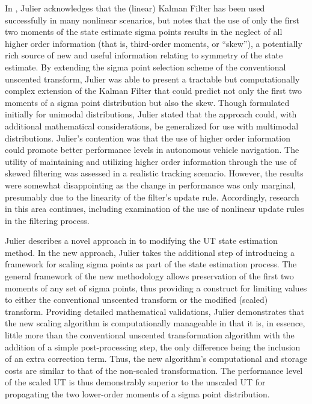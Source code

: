 In \cite{Julier1998}, Julier acknowledges that the (linear) Kalman Filter has been used successfully in many nonlinear scenarios, but notes that the use of only the first two moments of the state estimate sigma points results in the neglect of all higher order information (that is, third-order moments, or ``skew''), a potentially rich source of new and useful information relating to symmetry of the state estimate. By extending the sigma point selection scheme of the conventional unscented transform, Julier was able to present a tractable but computationally complex extension of the Kalman Filter that could predict not only the first two moments of a sigma point distribution but also the skew. Though formulated initially for unimodal distributions, Julier stated that the approach could, with additional mathematical considerations, be generalized for use with multimodal distributions. Julier's contention was that the use of higher order information could promote better performance levels in autonomous vehicle navigation. The utility of maintaining and utilizing higher order information through the use of skewed filtering was assessed in a realistic tracking scenario. However, the results were somewhat disappointing as the change in performance was only marginal, presumably due to the linearity of the filter's update rule. Accordingly, research in this area continues, including examination of the use of nonlinear update rules in the filtering process.

Julier describes a novel approach in \cite{Julier2002} to modifying the UT state estimation method. In the new approach, Julier takes the additional step of introducing a framework for scaling sigma points as part of the state estimation process. The general framework of the new methodology allows preservation of the first two moments of any set of sigma points, thus providing a construct for limiting values to either the conventional unscented transform or the modified (scaled) transform. Providing detailed mathematical validations, Julier demonstrates that the new scaling algorithm is computationally manageable in that it is, in essence, little more than the conventional unscented transformation algorithm with the addition of a simple post-processing step, the only difference being the inclusion of an extra correction term. Thus, the new algorithm's computational and storage costs are similar to that of the non-scaled transformation. The performance level of the scaled UT is thus demonstrably superior to the unscaled UT for propagating the two lower-order moments of a sigma point distribution.

